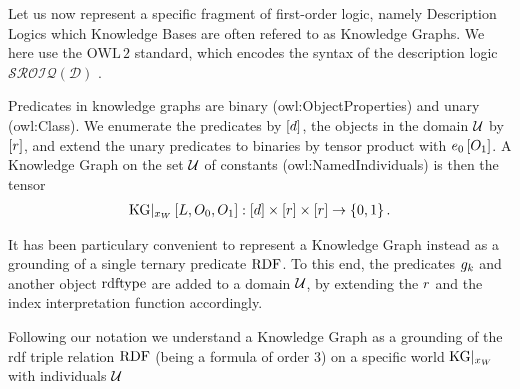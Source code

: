 \label{sec:kgRepresentation}

Let us now represent a specific fragment of first-order logic, namely Description Logics which Knowledge Bases are often refered to as Knowledge Graphs.
We here use the $\mathrm{OWL\,2}$ standard, which encodes the syntax of the description logic $\mathcal{SROIQ(D)}$ \cite{rudolph_foundations_2011}.


Predicates in knowledge graphs are binary (owl:ObjectProperties) and unary (owl:Class).
We enumerate the predicates by $[d]$, the objects in the domain $\mathcal{U}$ by $[r]$, and extend the unary predicates to binaries by tensor product with $e_{0}\left[O_{1}\right]$.
A Knowledge Graph on the set $\mathcal{U}$ of constants (owl:NamedIndividuals) is then the tensor
\begin{align*}
    \mathrm{KG}|_{x_{W}}\left[L,O_{0},O_{1}\right] : [d] \times [r] \times [r] \rightarrow \{0,1\} \, .
\end{align*}


\label{subsec:knowledgeGraphTernaryRep}

It has been particulary convenient to represent a Knowledge Graph instead as a grounding of a single ternary predicate $\mathrm{RDF}$.
To this end, the predicates $g_{k}$ and another object $\mathrm{rdftype}$ are added to a domain $\mathcal{U}$, by extending the $r$ and the index interpretation function accordingly.


Following our notation we understand a Knowledge Graph as a grounding of the rdf triple relation $\mathrm{RDF}$ (being a formula of order 3) on a specific world $\mathrm{KG}|_{x_{W}}$ with individuals $\mathcal{U}$

